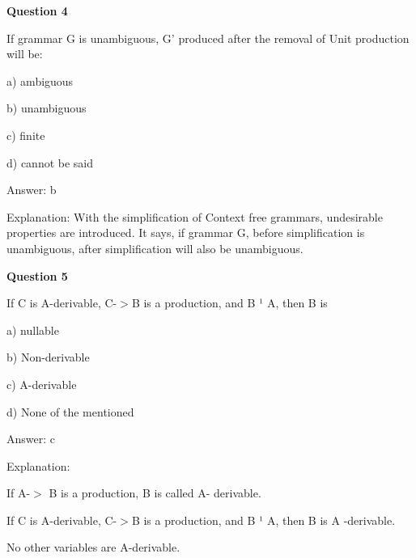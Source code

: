 \documentclass{article}
\begin{document}
\begin{mdframed}[linewidth=1pt, roundcorner=5pt, linecolor=gray!30, backgroundcolor=gray!5]
\textbf{Question 4} 

If grammar G is unambiguous, G' produced after the removal of Unit production will be:

a) ambiguous

b) unambiguous

c) finite

d) cannot be said
\vspace{5pt} \par
\begin{tcolorbox}[colback=green!5, colframe=green!40!black, title=Solution]
Answer: b

Explanation: With the simplification of Context free grammars, undesirable properties are introduced. It says, if grammar G, before simplification is unambiguous, after simplification will also be unambiguous.
\end{tcolorbox}
\end{mdframed}

\begin{mdframed}[linewidth=1pt, roundcorner=5pt, linecolor=gray!30, backgroundcolor=gray!5]
\textbf{Question 5} 

If C is A-derivable, C-$>$B is a production, and B ¹ A, then B is

a) nullable

b) Non-derivable

c) A-derivable

d) None of the mentioned
\vspace{5pt} \par
\begin{tcolorbox}[colback=green!5, colframe=green!40!black, title=Solution]
Answer: c

Explanation:

If A-$>$ B is a production, B is called A- derivable.

If C is A-derivable, C-$>$B is a production, and B ¹ A, then B is A -derivable.

No other variables are A-derivable.
\end{tcolorbox}
\end{mdframed}
\newpage
\end{document}
